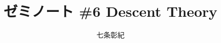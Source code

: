 \documentclass[a4paper]{jsarticle}
\begin{document}
\title{ゼミノート \#6 Descent Theory}
\author{七条彰紀}
\maketitle



\end{document}
